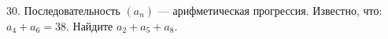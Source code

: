 30. Последовательность $(a_n)$ --- арифметическая прогрессия. Известно, что: $a_4+a_6=38.$ Найдите $a_2+a_5+a_{8}.$\\
